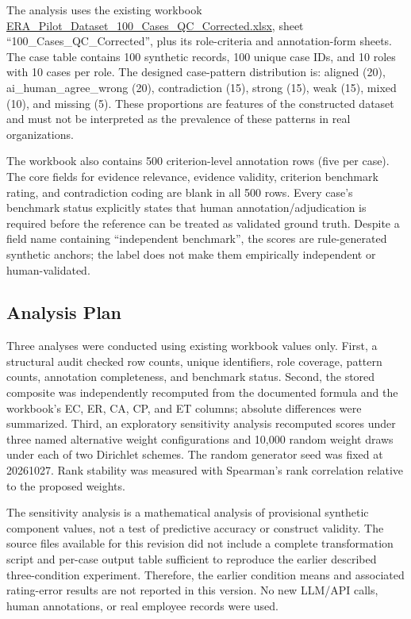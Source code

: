 \documentclass[
  10pt,
  a4paper,
  runningheads]{llncs}
\begin{document}
The analysis uses the existing workbook
\url{ERA_Pilot_Dataset_100_Cases_QC_Corrected.xlsx}, sheet
``100\_Cases\_QC\_Corrected'', plus its role-criteria and
annotation-form sheets. The case table contains 100 synthetic records,
100 unique case IDs, and 10 roles with 10 cases per role. The designed
case-pattern distribution is: aligned (20), ai\_human\_agree\_wrong
(20), contradiction (15), strong (15), weak (15), mixed (10), and
missing (5). These proportions are features of the constructed dataset
and must not be interpreted as the prevalence of these patterns in real
organizations.

The workbook also contains 500 criterion-level annotation rows (five per
case). The core fields for evidence relevance, evidence validity,
criterion benchmark rating, and contradiction coding are blank in all
500 rows. Every case's benchmark status explicitly states that human
annotation/adjudication is required before the reference can be treated
as validated ground truth. Despite a field name containing ``independent
benchmark'', the scores are rule-generated synthetic anchors; the label
does not make them empirically independent or human-validated.

\subsection{Analysis Plan}\label{analysis-plan}

Three analyses were conducted using existing workbook values only.
First, a structural audit checked row counts, unique identifiers, role
coverage, pattern counts, annotation completeness, and benchmark status.
Second, the stored composite was independently recomputed from the
documented formula and the workbook's EC, ER, CA, CP, and ET columns;
absolute differences were summarized. Third, an exploratory sensitivity
analysis recomputed scores under three named alternative weight
configurations and 10,000 random weight draws under each of two
Dirichlet schemes. The random generator seed was fixed at 20261027. Rank
stability was measured with Spearman's rank correlation relative to the
proposed weights.

The sensitivity analysis is a mathematical analysis of provisional
synthetic component values, not a test of predictive accuracy or
construct validity. The source files available for this revision did not
include a complete transformation script and per-case output table
sufficient to reproduce the earlier described three-condition
experiment. Therefore, the earlier condition means and associated
rating-error results are not reported in this version. No new LLM/API
calls, human annotations, or real employee records were used.
\end{document}
